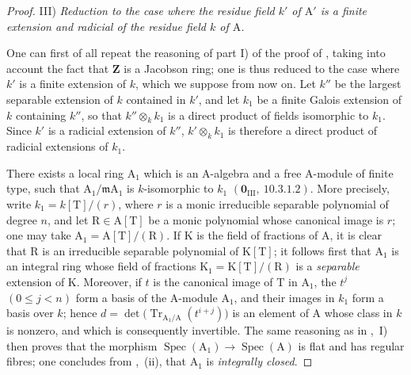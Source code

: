 \begin{proof}
\medskip
\noindent III) \emph{Reduction to the case where the residue field $k'$ of $\mathrm{A}'$ is a finite extension and radicial of the
residue field $k$ of $\mathrm{A}$.}

\medskip
One can first of all repeat the reasoning of part I) of the
proof of , taking into account the fact that $\mathbf{Z}$ is a
Jacobson ring; one is thus reduced to the case where $k'$ is a finite extension of $k$, which we suppose from now on.
Let $k''$ be the largest separable extension of $k$ contained in $k'$, and let $k_1$ be a finite Galois extension of $k$ containing $k''$, so that $k''\otimes_k k_1$ is a direct product of fields isomorphic to $k_1$.
Since $k'$ is a radicial extension of $k''$, $k'\otimes_k k_1$ is therefore a direct product of radicial extensions of $k_1$.

There exists a local ring $\mathrm{A}_1$ which is an $\mathrm{A}$-algebra and a free $\mathrm{A}$-module of finite type, such that $\mathrm{A}_1/\mathfrak{m}\mathrm{A}_1$ is $k$-isomorphic to $k_1$ $(\mathbf{0}_{\mathrm{III}},~10.3.1.2)$.
More precisely, write $k_1=k[\mathrm{T}]/(r)$, where $r$ is a monic irreducible separable polynomial of degree $n$, and let $\mathrm{R}\in\mathrm{A}[\mathrm{T}]$ be a monic polynomial whose canonical image is $r$; one may take $\mathrm{A}_1=\mathrm{A}[\mathrm{T}]/(\mathrm{R})$.
If $\mathrm{K}$ is the field of fractions of $\mathrm{A}$, it is clear that $\mathrm{R}$ is an irreducible separable polynomial of $\mathrm{K}[\mathrm{T}]$; it follows first that $\mathrm{A}_1$ is an integral ring whose field of fractions $\mathrm{K}_1=\mathrm{K}[\mathrm{T}]/(\mathrm{R})$ is a \emph{separable} extension of $\mathrm{K}$.
Moreover, if $t$ is the canonical image of $\mathrm{T}$ in $\mathrm{A}_1$, the $t^j$ $(0\leq j<n)$ form a basis of the $\mathrm{A}$-module $\mathrm{A}_1$, and their images in $k_1$ form a basis over $k$; hence $d=\det\bigl(\operatorname{Tr}_{\mathrm{A}_1/\mathrm{A}}(t^{i+j})\bigr)$ is an element of $\mathrm{A}$ whose class in $k$ is nonzero, and which is consequently invertible.
The same reasoning as in ,~I) then proves that the morphism $\operatorname{Spec}(\mathrm{A}_1)\to\operatorname{Spec}(\mathrm{A})$ is flat and has regular fibres; one concludes from ,~(ii), that $\mathrm{A}_1$ is \emph{integrally closed}.


\end{proof}
